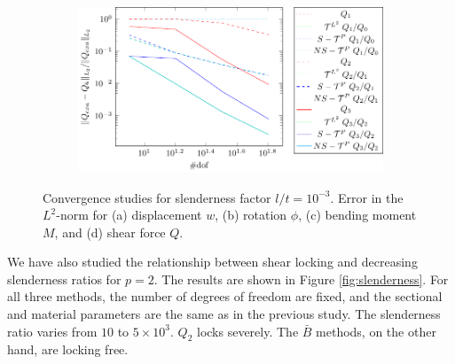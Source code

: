 \documentclass{article}
\begin{document}
\begin{figure}
\begin{subfigure}[b]{0.49\linewidth}
        \caption{}
        \vspace*{2mm}
    \end{subfigure}
    \begin{subfigure}[b]{0.49\linewidth}        %
        \centering
        \includegraphics[width=\linewidth]{Q-sin}
        \caption{}
        \vspace*{2mm}
    \end{subfigure}
    \caption{Convergence studies for slenderness factor $l/t=10^{-3}$. Error in the $L^2$-norm for (a) displacement $w$, (b) rotation $\phi$, (c) bending moment $M$, and (d) shear force $Q$.}
    \label{fig:timoshenko_result}
\end{figure}

We have also studied the relationship between shear locking and decreasing slenderness ratios for $p=2$. The results are shown in Figure \ref{fig:slenderness}. For all three methods, the number of degrees of freedom are fixed, and the sectional and material parameters are the same as in the previous study. The slenderness ratio varies from $10$ to $5\times{10}^3$. $Q_2$ locks severely. The $\bar{B}$ methods, on the other hand, are locking free. 
\end{document}
